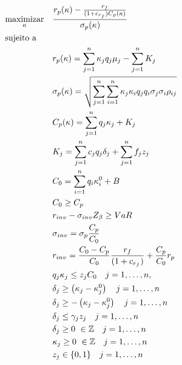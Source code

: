         \begin{subequations}
            \label{eq:otimizacao}
            \begin{align}
                & \underset{\kappa}{\text{maximizar}}
                & & \frac{r_{p}(\kappa) - \frac{r_{f}}{(1+c_{r_{f}}) C_{p}(\kappa)}}{\sigma_{p}(\kappa)} \\
                & \text{sujeito a} \notag \\
                & & & r_{p}(\kappa) = \sum_{j=1}^{n} \kappa_{j} q_{j} \mu_{j} -  \sum_{j=1}^{n} K_{j} \\
                & & & \sigma_{p}(\kappa) = \sqrt{\sum_{j=1}^{n} \sum_{i=1}^{n} \kappa_{j} \kappa_{i} q_{j} q_{i} \sigma_{j} \sigma_{i} \rho_{ij}} \\
                & & & C_{p}(\kappa) = \sum_{j=1}^{n} q_{j}\kappa_{j} + K_{j} \\
                & & & K_{j} = \sum_{j=1}^{n}c_{j}q_{j}\delta_{j} + \sum_{j=1}^{n} f_{j} z_{j}   \\
                & & & C_{0} = \sum_{i=1}^{n}q_{i}\kappa_{i}^{0}+ B \\
                & & & C_{0} \geq C_{p} \\
                & & & r_{inv} - \sigma_{inv} Z_{\beta} \geq VaR \\
                & & & \sigma_{inv} = \sigma_{p} \frac{C_{p}}{C_{0}} \\
                & & & r_{inv} = \frac{C_{0} - C_{p}}{C_{0}} \frac{r_{f}}{(1+c_{r_{f}})} + \frac{C_{p}}{C_{0}} r_{p} \\
                & & &  q_{j}\kappa_{j} \leq z_{j} C_{0} \quad j=1, \ldots, n \text{,} \\
                & & & \delta_{j} \geq \left( \kappa_{j} -\kappa_{j}^{0} \right) \quad j=1, \ldots, n\\
                & & & \delta_{j} \geq -\left( \kappa_{j} -\kappa_{j}^{0} \right) \quad j=1, \ldots, n\\
                & & & \delta_{j} \leq \gamma_{j}z_{j} \quad j=1, \ldots, n \\
                & & & \delta_{j} \geq 0 \ \in \mathbb{Z} \quad j=1, \ldots, n \\
                & & & \kappa_{j} \geq 0 \ \in \mathbb{Z} \quad j=1, \ldots, n \\
                & & & z_{j} \in\{0,1\} \quad j=1, \ldots, n 
            \end{align}
        \end{subequations}

